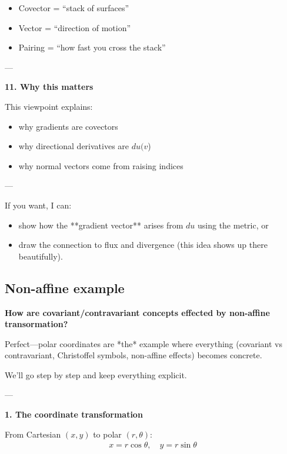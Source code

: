 \documentclass[12pt,a4paper]{report}
\begin{document}
\begin{description}
\begin{description}
\begin{itemize}
\item Covector = “stack of surfaces”
\item Vector = “direction of motion”
\item Pairing = “how fast you cross the stack”
\end{itemize}

---

\item \textbf{11. Why this matters}

This viewpoint explains:

\begin{itemize}
\item why gradients are covectors
\item why directional derivatives are $du(v$)
\item why normal vectors come from raising indices
\end{itemize}

---
\end{description}

If you want, I can:

\begin{itemize}
\item show how the **gradient vector** arises from $du$ using the metric, or
\item draw the connection to flux and divergence (this idea shows up there beautifully).
\end{itemize}


\subsection*{Non-affine example}
\item \textbf{How are covariant/contravariant concepts effected by non-affine transormation?}

Perfect—polar coordinates are *the* example where everything (covariant vs contravariant, Christoffel symbols, non-affine effects) becomes concrete.

We’ll go step by step and keep everything explicit.

---

\begin{description}
\item \textbf{1. The coordinate transformation}

From Cartesian $(x,y)$ to polar $(r,\theta)$:
\begin{align*}
x = r\cos\theta,\quad y = r\sin\theta
\end{align*}


\end{description}
\end{description}
\end{document}
